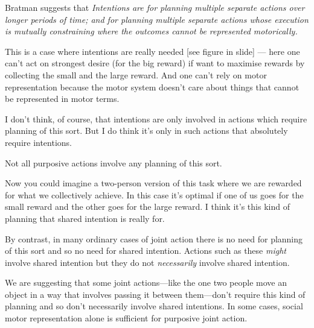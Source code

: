 \documentclass[12pt,\papersize]{extarticle}
\begin{document}
 Bratman suggests that 
\emph{Intentions are for planning multiple separate actions over longer periods of time; and for planning multiple separate actions whose execution is mutually constraining where the outcomes cannot be represented motorically.}

This is a case where intentions are really needed [see figure in slide] --- here one can’t act on strongest desire (for the big reward) if want to maximise rewards by collecting the small and the large reward.
And one can’t rely on motor representation because the motor system doesn’t care about things that cannot be represented in motor terms.

I don't think, of course, that intentions are only involved in actions which require planning of this sort.
But I do think it's only in such actions that absolutely require intentions.

Not all purposive actions involve any planning of this sort. 

Now you could imagine a two-person version of this task where we are rewarded for what we collectively achieve.  In this case it’s optimal if one of us goes for the small reward and the other goes for the large reward.  I think it’s this kind of planning that shared intention is really for.


By contrast, in many ordinary cases of joint action there is no need for planning of this sort and so no need for shared intention.  Actions such as these \emph{might} involve shared intention but they do not \emph{necessarily} involve shared intention.

We are suggesting that some joint actions---like the one two people move an object in a way that involves passing it between them---don’t require this kind of planning and so don’t necessarily involve shared intentions.
In some cases, social motor representation alone is sufficient for purposive joint action.





\end{document}
